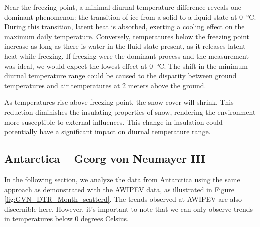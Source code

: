 
Near the freezing point, a minimal diurnal temperature difference reveals one dominant phenomenon: the transition of ice from a solid to a liquid state at \SI{0}{\celsius}. During this transition, latent heat is absorbed, exerting a cooling effect on the maximum daily temperature. Conversely, temperatures below the freezing point increase as long as there is water in the fluid state present, as it releases latent heat while freezing. If freezing were the dominant process and the measurement was ideal, we would expect the lowest effect at \SI{0}{\celsius}.
The shift in the minimum diurnal temperature range could be caused to the disparity between ground temperatures and air temperatures at 2 meters above the ground.

As temperatures rise above freezing point, the snow cover will shrink. This reduction diminishes the insulating properties of snow, rendering the environment more susceptible to external influences. This change in insulation could potentially have a significant impact on diurnal temperature range.



\subsection*{Antarctica -- Georg von Neumayer III}

In the following section, we analyze the data from Antarctica using the same approach as demonstrated with the AWIPEV data, as illustrated in Figure \ref{fig:GVN_DTR_Month_scatterd}. The trends observed at AWIPEV are also discernible here. However, it's important to note that we can only observe trends in temperatures below 0 degrees Celsius.

